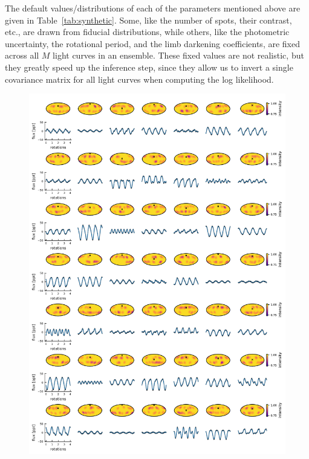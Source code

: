 \documentclass[modern]{aastex62}
\begin{document}
The default values/distributions of each of the parameters mentioned above are given in
Table~\ref{tab:synthetic}. Some, like the number of spots, their contrast,
etc., are drawn from fiducial distributions, while others, like the
photometric uncertainty, the rotational period, and the limb darkening
coefficients,
are fixed across all $M$ light curves in an ensemble. These fixed values
are not realistic, but they greatly speed up the inference step, since they
allow us to invert a single covariance matrix for all light curves when computing
the log likelihood.

\begin{figure}[p!]
    \begin{centering}
        \includegraphics[width=0.9\linewidth]{figures/calibration_default_data.pdf}
    \end{centering}
\end{figure}
\end{document}
